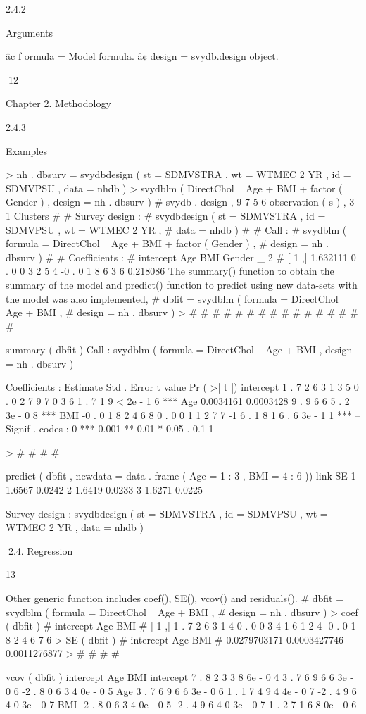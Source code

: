 2.4.2

Arguments

â¢ f ormula = Model formula.
â¢ design = svydb.design object.

12

Chapter 2. Methodology

2.4.3

Examples

> nh . dbsurv = svydbdesign ( st = SDMVSTRA , wt = WTMEC 2 YR ,
id = SDMVPSU , data = nhdb )
> svydblm ( DirectChol ~ Age + BMI + factor ( Gender ) ,
design = nh . dbsurv )
# svydb . design , 9 7 5 6 observation ( s ) , 3 1 Clusters
#
# Survey design :
# svydbdesign ( st = SDMVSTRA , id = SDMVPSU , wt = WTMEC 2 YR ,
#
data = nhdb )
#
# Call :
# svydblm ( formula = DirectChol ~ Age + BMI + factor ( Gender ) ,
#
design = nh . dbsurv )
#
# Coefficients :
#
intercept Age
BMI
Gender _ 2
# [ 1 ,]
1.632111
0 . 0 0 3 2 5 4 -0 . 0 1 8 6 3 6
0.218086
The summary() function to obtain the summary of the model and predict() function to predict using new data-sets with the model was also implemented,
# dbfit = svydblm ( formula = DirectChol ~ Age + BMI ,
#
design = nh . dbsurv )
>
#
#
#
#
#
#
#
#
#
#
#
#
#
#
#
#

summary ( dbfit )
Call :
svydblm ( formula = DirectChol ~ Age + BMI ,
design = nh . dbsurv )

Coefficients :
Estimate Std . Error t value Pr ( >| t |)
intercept 1 . 7 2 6 3 1 3 5 0 . 0 2 7 9 7 0 3 6 1 . 7 1 9 < 2e - 1 6 ***
Age
0.0034161 0.0003428
9 . 9 6 6 5 . 2 3e - 0 8 ***
BMI
-0 . 0 1 8 2 4 6 8 0 . 0 0 1 1 2 7 7 -1 6 . 1 8 1 6 . 6 3e - 1 1 ***
--Signif . codes : 0
***
0.001
**
0.01
*
0.05
.
0.1
1

>
#
#
#
#

predict ( dbfit , newdata = data . frame ( Age = 1 : 3 , BMI = 4 : 6 ))
link
SE
1 1.6567 0.0242
2 1.6419 0.0233
3 1.6271 0.0225

Survey design :
svydbdesign ( st = SDMVSTRA , id = SDMVPSU , wt = WTMEC 2 YR ,
data = nhdb )

2.4. Regression

13

Other generic function includes coef(), SE(), vcov() and residuals().
# dbfit = svydblm ( formula = DirectChol ~ Age + BMI ,
#
design = nh . dbsurv )
> coef ( dbfit )
#
intercept
Age
BMI
# [ 1 ,] 1 . 7 2 6 3 1 4 0 . 0 0 3 4 1 6 1 2 4 -0 . 0 1 8 2 4 6 7 6
> SE ( dbfit )
#
intercept
Age
BMI
# 0.0279703171 0.0003427746 0.0011276877
>
#
#
#
#

vcov ( dbfit )
intercept
Age
BMI
intercept 7 . 8 2 3 3 8 6e - 0 4 3 . 7 6 9 6 6 3e - 0 6 -2 . 8 0 6 3 4 0e - 0 5
Age
3 . 7 6 9 6 6 3e - 0 6 1 . 1 7 4 9 4 4e - 0 7 -2 . 4 9 6 4 0 3e - 0 7
BMI
-2 . 8 0 6 3 4 0e - 0 5 -2 . 4 9 6 4 0 3e - 0 7 1 . 2 7 1 6 8 0e - 0 6

